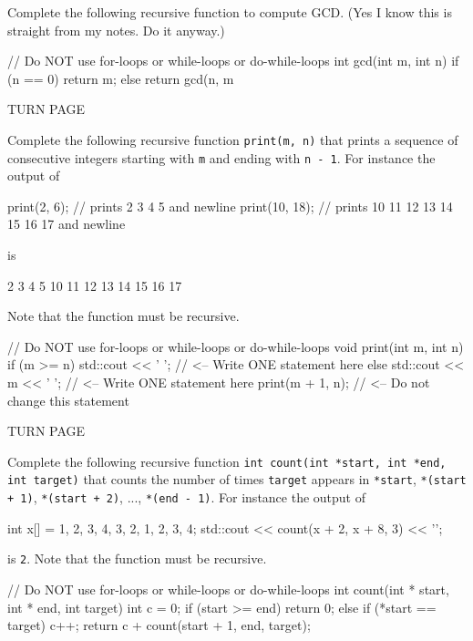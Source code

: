 

\nextq
Complete the following recursive function to compute GCD.
(Yes I know this is straight from my notes. Do it anyway.)
\\
\ANSWER
\begin{answercode}
// Do NOT use for-loops or while-loops or do-while-loops
int gcd(int m, int n)
{
  if (n == 0)
  {
    return m;
  }
  else
  {
    return gcd(n, m %
  }
}
\end{answercode}

TURN PAGE

\newpage
\nextq
Complete the following recursive function
\verb!print(m, n)! that prints a sequence
of consecutive integers starting with \verb!m!
and ending with \verb!n - 1!.
For instance the output of
\begin{console}[fontsize=\small]
print(2, 6);   // prints 2 3 4 5 and newline
print(10, 18); // prints 10 11 12 13 14 15 16 17 and newline
\end{console}
is
\begin{console}[fontsize=\small]
2 3 4 5
10 11 12 13 14 15 16 17
\end{console}
Note that the function must be recursive.
\\
\ANSWER
\begin{answercode}
// Do NOT use for-loops or while-loops or do-while-loops
void print(int m, int n)
{
    if (m >= n)
    {
        std::cout << ' ';        // <-- Write ONE statement here
    }
    else
    {
        std::cout << m << ' ';   // <-- Write ONE statement here
        print(m + 1, n);         // <-- Do not change this statement
    }
}
\end{answercode}

TURN PAGE

\newpage
\nextq
Complete the following recursive function
\texttt{int count(int *start, int *end, int target)}
that counts the number of times \verb!target!
appears in
\verb!*start!, \verb!*(start + 1)!, \verb!*(start + 2)!,
..., \verb!*(end - 1)!.
For instance the output of
\begin{console}[fontsize=\small]
int x[] = {1, 2, 3, 4, 3, 2, 1, 2, 3, 4};
std::cout << count(x + 2, x + 8, 3) << '\n';
\end{console}
is \verb!2!.
Note that the function must be recursive.
\\
\ANSWER
\begin{answercode}
// Do NOT use for-loops or while-loops or do-while-loops
int count(int * start, int * end, int target)
{
    int c = 0;
    if (start >= end)
    {
        return 0;
    }
    else
    {
      if (*start == target)
      {
        c++;
      }
      return c + count(start + 1, end, target);
    }
}
\end{answercode}



